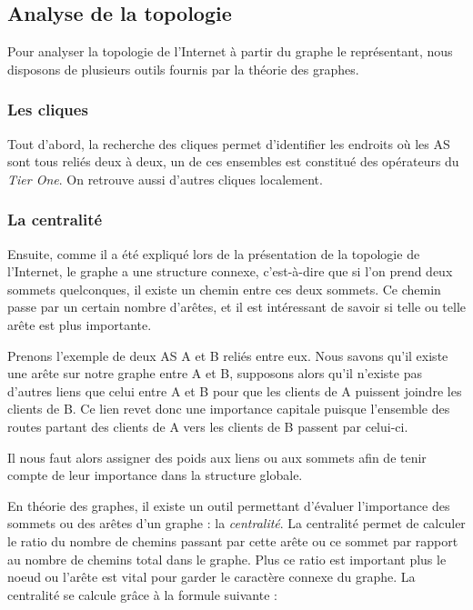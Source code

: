 

%

\subsection{Analyse de la topologie}

\par
Pour analyser la topologie de l'Internet \`a partir du graphe le repr\'esentant, nous disposons de plusieurs outils fournis par la th\'eorie des graphes.

\subsubsection{Les cliques}

Tout d'abord, la recherche des cliques permet d'identifier les endroits o\`u les AS sont tous reli\'es deux \`a deux, un de ces ensembles est constitu\'e des op\'erateurs du \textit{Tier One}. On retrouve aussi d'autres cliques localement.

\subsubsection{La centralit\'e}

\par
Ensuite, comme il a été expliqu\'e lors de la pr\'esentation de la topologie de l'Internet, le graphe a une structure connexe, c'est-\`a-dire que si l'on prend deux sommets quelconques, il existe un chemin entre ces deux sommets.
Ce chemin passe par un certain nombre d'ar\^etes, et il est int\'eressant de savoir si telle ou telle ar\^ete est plus importante.
\par
Prenons l'exemple de deux AS A et B reli\'es entre eux. Nous savons qu'il existe une ar\^ete sur notre graphe entre A et B, supposons alors qu'il n'existe pas d'autres liens que celui entre A et B pour que les clients de A puissent joindre les clients de B. Ce lien revet donc une importance capitale puisque l'ensemble des routes partant des clients de A vers les clients de B passent par celui-ci.
\par
Il nous faut alors assigner des poids aux liens ou aux sommets afin de tenir compte de leur importance dans la structure globale.

\par
En th\'eorie des graphes, il existe un outil permettant d'\'evaluer l'importance des sommets ou des ar\^etes d'un graphe : la \textit{centralit\'e}. La centralit\'e permet de calculer le ratio du nombre de chemins passant par cette ar\^ete ou ce sommet par rapport au nombre de chemins total dans le graphe. Plus ce ratio est important plus le noeud ou l'ar\^ete est vital pour garder le caract\`ere connexe du graphe. La centralit\'e se calcule gr\^ace \`a la formule suivante :

